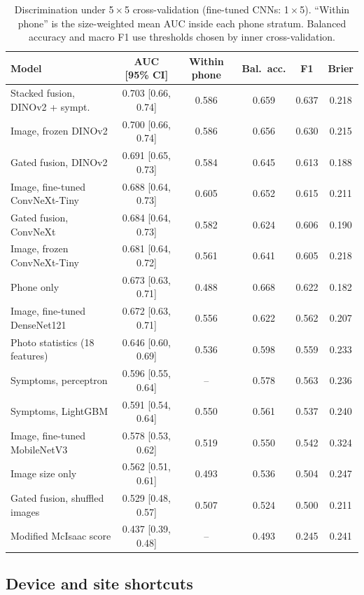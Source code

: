 \documentclass[preprint,12pt]{elsarticle}
\begin{document}
\begin{table}[!htbp]
\centering
\footnotesize
\caption{Discrimination under 5\,$\times$\,5 cross-validation (fine-tuned CNNs: 1\,$\times$\,5). ``Within phone'' is the size-weighted mean AUC inside each phone stratum. Balanced accuracy and macro F1 use thresholds chosen by inner cross-validation.}
\label{tab:main}
\setlength{\tabcolsep}{3.5pt}
\begin{tabular}{@{}>{\raggedright\arraybackslash}p{4.4cm}ccccc@{}}
\toprule
Model & AUC [95\% CI] & Within phone & Bal.\ acc. & F1 & Brier \\
\midrule
Stacked fusion, DINOv2 + sympt. & 0.703 [0.66, 0.74] & 0.586 & 0.659 & 0.637 & 0.218 \\
Image, frozen DINOv2 & 0.700 [0.66, 0.74] & 0.586 & 0.656 & 0.630 & 0.215 \\
Gated fusion, DINOv2 & 0.691 [0.65, 0.73] & 0.584 & 0.645 & 0.613 & 0.188 \\
Image, fine-tuned ConvNeXt-Tiny & 0.688 [0.64, 0.73] & 0.605 & 0.652 & 0.615 & 0.211 \\
Gated fusion, ConvNeXt & 0.684 [0.64, 0.73] & 0.582 & 0.624 & 0.606 & 0.190 \\
Image, frozen ConvNeXt-Tiny & 0.681 [0.64, 0.72] & 0.561 & 0.641 & 0.605 & 0.218 \\
Phone only & 0.673 [0.63, 0.71] & 0.488 & 0.668 & 0.622 & 0.182 \\
Image, fine-tuned DenseNet121 & 0.672 [0.63, 0.71] & 0.556 & 0.622 & 0.562 & 0.207 \\
Photo statistics (18 features) & 0.646 [0.60, 0.69] & 0.536 & 0.598 & 0.559 & 0.233 \\
Symptoms, perceptron & 0.596 [0.55, 0.64] & -- & 0.578 & 0.563 & 0.236 \\
Symptoms, LightGBM & 0.591 [0.54, 0.64] & 0.550 & 0.561 & 0.537 & 0.240 \\
Image, fine-tuned MobileNetV3 & 0.578 [0.53, 0.62] & 0.519 & 0.550 & 0.542 & 0.324 \\
Image size only & 0.562 [0.51, 0.61] & 0.493 & 0.536 & 0.504 & 0.247 \\
Gated fusion, shuffled images & 0.529 [0.48, 0.57] & 0.507 & 0.524 & 0.500 & 0.211 \\
Modified McIsaac score & 0.437 [0.39, 0.48] & -- & 0.493 & 0.245 & 0.241 \\
\bottomrule
\end{tabular}
\end{table}

\subsection{Device and site shortcuts}
\end{document}
